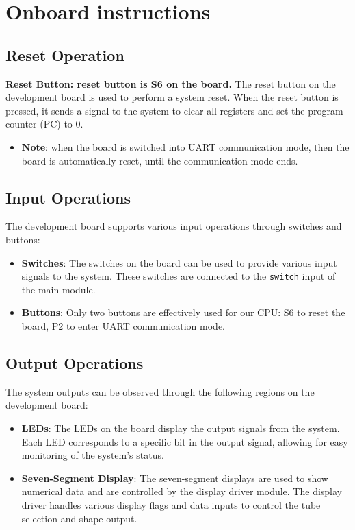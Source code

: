 \documentclass[a4paper,12pt]{article}
\begin{document}
\section{Onboard instructions}

\subsection{Reset Operation}
\textbf{Reset Button: reset button is S6 on the board.} The reset button on the development board is used to perform a system reset. When the reset button is pressed, it sends a signal to the system to clear all registers and set the program counter (PC) to 0. 

\begin{itemize}
    \item \textbf{Note}: when the board is switched into UART communication mode, then the board is automatically reset, until the communication mode ends. 
\end{itemize}

\subsection{Input Operations}
The development board supports various input operations through switches and buttons:
\begin{itemize}
    \item \textbf{Switches}: The switches on the board can be used to provide various input signals to the system. These switches are connected to the \texttt{switch} input of the main module.
    \item \textbf{Buttons}: Only two buttons are effectively used for our CPU: S6 to reset the board, P2 to enter UART communication mode. 
\end{itemize}

\subsection{Output Operations}
The system outputs can be observed through the following regions on the development board:
\begin{itemize}
    \item \textbf{LEDs}: The LEDs on the board display the output signals from the system. Each LED corresponds to a specific bit in the output signal, allowing for easy monitoring of the system's status.
    \item \textbf{Seven-Segment Display}: The seven-segment displays are used to show numerical data and are controlled by the display driver module. The display driver handles various display flags and data inputs to control the tube selection and shape output.
\end{itemize}
\end{document}
